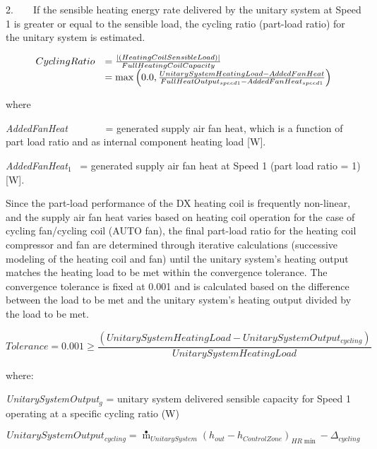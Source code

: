 2.~~~~If the sensible heating energy rate delivered by the unitary system at Speed 1 is greater or equal to the sensible load, the cycling ratio (part-load ratio) for the unitary system is estimated.

\begin{equation}
  \begin{array}{rl}
    CyclingRatio &= \frac{\left|\PB{HeatingCoilSensibleLoad}\right|}{FullHeatingCoilCapacity} \\
                 &= \max \PB{0.0,\frac{UnitarySystemHeatingLoad - AddedFanHeat}{FullHeatOutput_{speed1} - AddedFanHeat_{speed1}}}
  \end{array}
\end{equation}

where

\emph{AddedFanHeat}~~~~~~~ = generated supply air fan heat, which is a function of part load ratio and as internal component heating load {[}W{]}.

\emph{AddedFanHeat\(_{1}\)}~ = generated supply air fan heat at Speed 1 (part load ratio = 1) {[}W{]}.

Since the part-load performance of the DX heating coil is frequently non-linear, and the supply air fan heat varies based on heating coil operation for the case of cycling fan/cycling coil (AUTO fan), the final part-load ratio for the heating coil compressor and fan are determined through iterative calculations (successive modeling of the heating coil and fan) until the unitary system's heating output matches the heating load to be met within the convergence tolerance. The convergence tolerance is fixed at 0.001 and is calculated based on the difference between the load to be met and the unitary system's heating output divided by the load to be met.

\begin{equation}
Tolerance = 0.001 \ge \frac{{\left( {UnitarySystemHeatingLoad - UnitarySystemOutpu{t_{cycling}}} \right)}}{{UnitarySystemHeatingLoad}}
\end{equation}

where:

\emph{UnitarySystemOutput\(_{g}\)} = unitary system delivered sensible capacity for Speed 1 operating at a specific cycling ratio (W)

\begin{equation}
UnitarySystemOutpu{t_{cycling}} = {{\mathop m\limits^ \bullet  }_{UnitarySystem}}{\left( {{h_{out}} - {h_{ControlZone}}} \right)_{HR\min }} - {\Delta_{cycling}}
\end{equation}

